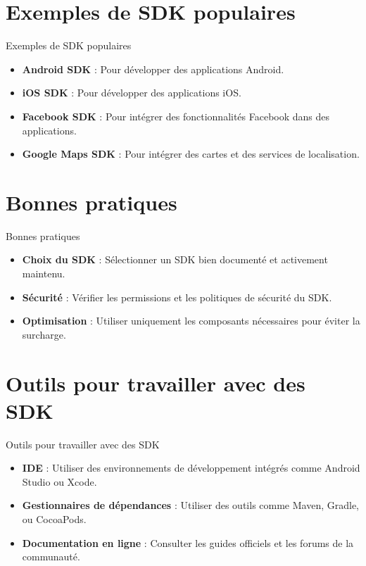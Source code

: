 \documentclass{clbeamer2024}
\begin{document}
	
	\section{Exemples de SDK populaires}
	\begin{frame}{Exemples de SDK populaires}
		\begin{itemize}
			\item \textbf{Android SDK} : Pour développer des applications Android.
			\item \textbf{iOS SDK} : Pour développer des applications iOS.
			\item \textbf{Facebook SDK} : Pour intégrer des fonctionnalités Facebook dans des applications.
			\item \textbf{Google Maps SDK} : Pour intégrer des cartes et des services de localisation.
		\end{itemize}
	\end{frame}
	
	
	\section{Bonnes pratiques}
	\begin{frame}{Bonnes pratiques}
		\begin{itemize}
			\item \textbf{Choix du SDK} : Sélectionner un SDK bien documenté et activement maintenu.
			\item \textbf{Sécurité} : Vérifier les permissions et les politiques de sécurité du SDK.
			\item \textbf{Optimisation} : Utiliser uniquement les composants nécessaires pour éviter la surcharge.
		\end{itemize}
	\end{frame}
	
	\section{Outils pour travailler avec des SDK}
	\begin{frame}{Outils pour travailler avec des SDK}
		\begin{itemize}
			\item \textbf{IDE} : Utiliser des environnements de développement intégrés comme Android Studio ou Xcode.
			\item \textbf{Gestionnaires de dépendances} : Utiliser des outils comme Maven, Gradle, ou CocoaPods.
			\item \textbf{Documentation en ligne} : Consulter les guides officiels et les forums de la communauté.
		\end{itemize}
	\end{frame}
	
\end{document}
